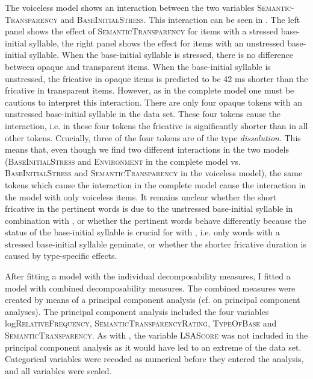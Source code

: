 The voiceless model shows an interaction between the two variables \textsc{Seman\-tic-Transparency} and \textsc{BaseInitialStress}. This interaction can be seen in . The left panel shows the effect of \textsc{SemanticTransparency} for items with a stressed base-initial syllable, the right panel shows the effect for items with an unstressed base-initial syllable. When the base-initial syllable is stressed, there is no difference between opaque and transparent items. When the base-initial syllable is unstressed, the fricative in opaque items is predicted to be 42 ms shorter than the fricative in transparent items. However, as in the complete model one must be cautious to  interpret this interaction. There are only four opaque tokens with an unstressed base-initial syllable in the data set. These four tokens cause the interaction, i.e. in these four tokens the fricative is significantly shorter than in all other tokens. 
Crucially, three of the four tokens are of the type \textit{dissolution}. This means that, even though we find two different interactions in the two models (\textsc{BaseInitialStress} and \textsc{Environment} in the complete model vs. \textsc{BaseInitialStress} and \textsc{SemanticTransparency} in the voiceless model), the same tokens which cause the interaction in the complete model cause the interaction in the model with only voiceless items. It remains unclear whether the short fricative in the pertinent words is due to the unstressed base-initial syllable in combination with , or whether the pertinent words behave differently because the  status of the base-initial syllable is crucial for  with , i.e. only words with a stressed base-initial syllable geminate, or whether the shorter fricative duration is caused by type-specific effects. 



After fitting a model with the individual decomposability measures, I fitted a model with combined decomposability measures. The combined measures were created by means of a principal component analysis (cf.  on principal component analyses). 
The principal component analysis included the four variables log\textsc{RelativeFrequency}, \textsc{SemanticTransparencyRating}, \textsc{TypeOfBase} and \textsc{SemanticTransparency}. As with , the variable \textsc{LSAScore} was not included in the principal component analysis as it would have led to an extreme  of the data set. Categorical variables were recoded as numerical before they entered the analysis, and all variables were scaled.




